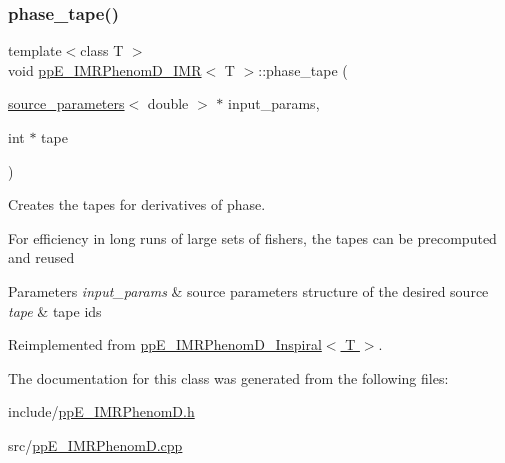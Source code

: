\subsubsection{\texorpdfstring{phase\+\_\+tape()}{phase\_tape()}}
{\footnotesize\ttfamily template$<$class T $>$ \\
void \hyperlink{classppE__IMRPhenomD__IMR}{pp\+E\+\_\+\+I\+M\+R\+Phenom\+D\+\_\+\+I\+MR}$<$ T $>$\+::phase\+\_\+tape (\begin{DoxyParamCaption}\item[{\hyperlink{structsource__parameters}{source\+\_\+parameters}$<$ double $>$ $\ast$}]{input\+\_\+params,  }\item[{int $\ast$}]{tape }\end{DoxyParamCaption})\hspace{0.3cm}{\ttfamily [virtual]}}



Creates the tapes for derivatives of phase. 

For efficiency in long runs of large sets of fishers, the tapes can be precomputed and reused 
\begin{DoxyParams}{Parameters}
{\em input\+\_\+params} & source parameters structure of the desired source \\
\hline
{\em tape} & tape ids \\
\hline
\end{DoxyParams}


Reimplemented from \hyperlink{classppE__IMRPhenomD__Inspiral_a2fb1a8fb66e4204dbe397b792933afbe}{pp\+E\+\_\+\+I\+M\+R\+Phenom\+D\+\_\+\+Inspiral$<$ T $>$}.



The documentation for this class was generated from the following files\+:\begin{DoxyCompactItemize}
\item 
include/\hyperlink{ppE__IMRPhenomD_8h}{pp\+E\+\_\+\+I\+M\+R\+Phenom\+D.\+h}\item 
src/\hyperlink{ppE__IMRPhenomD_8cpp}{pp\+E\+\_\+\+I\+M\+R\+Phenom\+D.\+cpp}\end{DoxyCompactItemize}
